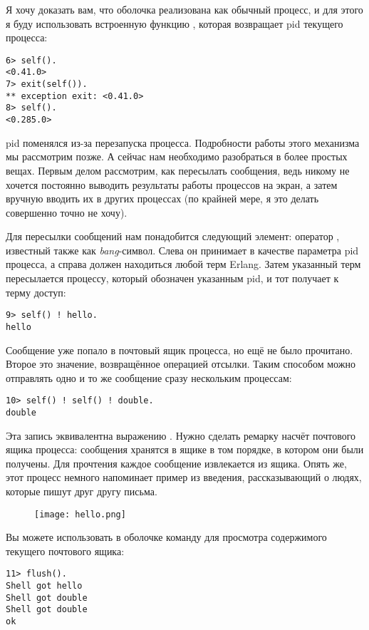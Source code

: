 Я хочу доказать вам, что оболочка реализована как обычный процесс, и для этого я буду использовать встроенную функцию , которая возвращает pid текущего процесса:
\begin{lstlisting}[style=erlang]
6> self().
<0.41.0>
7> exit(self()).
** exception exit: <0.41.0>
8> self().
<0.285.0>
\end{lstlisting}
pid поменялся из\--за перезапуска процесса.
Подробности работы этого механизма мы рассмотрим позже.
А сейчас нам необходимо разобраться в более простых вещах.
Первым делом рассмотрим, как пересылать сообщения, ведь никому не хочется постоянно выводить результаты работы процессов на экран, а затем вручную вводить их в других процессах (по крайней мере, я это делать совершенно точно не хочу).

Для пересылки сообщений нам понадобится следующий элемент: оператор \ops{!\strut}, известный также как \emph{bang}\--символ.
Слева он принимает в качестве параметра pid процесса, а справа должен находиться любой терм Erlang.
Затем указанный терм пересылается процессу, который обозначен указанным pid, и тот получает к терму доступ:
\begin{lstlisting}[style=erlang]
9> self() ! hello.
hello
\end{lstlisting}

Сообщение уже попало в почтовый ящик процесса, но ещё не было прочитано.
Второе  это значение, возвращённое операцией отсылки.
Таким способом можно отправлять одно и то же сообщение сразу нескольким процессам:
\begin{lstlisting}[style=erlang]
10> self() ! self() ! double.
double
\end{lstlisting}

Эта запись эквивалентна выражению .
Нужно сделать ремарку насчёт почтового ящика процесса: сообщения хранятся в ящике в том порядке, в котором они были получены.
Для прочтения каждое сообщение извлекается из ящика.
Опять же, этот процесс немного напоминает пример из введения, рассказывающий о людях, которые пишут друг другу письма.
\begin{figure}[h!]
    \centering
    \texttt{[image: hello.png]}
\end{figure}

Вы можете использовать в оболочке команду  для просмотра содержимого текущего почтового ящика:
\begin{lstlisting}[style=erlang]
11> flush().
Shell got hello
Shell got double
Shell got double
ok
\end{lstlisting}

